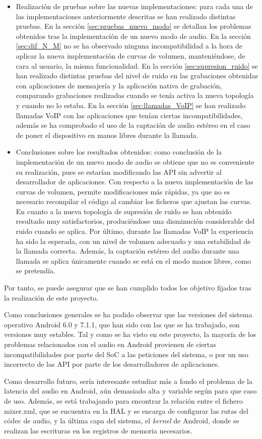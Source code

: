 \begin{itemize}
	\item{Realización de pruebas sobre las nuevas implementaciones: para cada una de las implementaciones anteriormente descritas se han realizado distintas pruebas. En la sección \ref{sec:pruebas_nuevo_modo} se detallan los problemas obtenidos tras la implementación de un nuevo modo de audio. En la sección \ref{sec:dif_N_M} no se ha observado ninguna incompatibilidad a la hora de aplicar la nueva implementación de curvas de volumen, manteniéndose, de cara al usuario, la misma funcionalidad. En la sección \ref{sec:supresion_ruido} se han realizado distintas pruebas del nivel de ruido en las grabaciones obtenidas con aplicaciones de mensajería y la aplicación nativa de grabación, comparando grabaciones realizadas cuando se tenía activa la nueva topología y cuando no lo estaba. En la sección \ref{sec:llamadas_VoIP} se han realizado llamadas \gls{VoIP} con las aplicaciones que tenían ciertas incompatibilidades, además se ha comprobado el uso de la captación de audio estéreo en el caso de poner el dispositivo en manos libres durante la llamada.}
	\item{Conclusiones sobre los resultados obtenidos: como conclusión de la implementación de un nuevo modo de audio se obtiene que no es conveniente su realización, pues se estarían modificando las \gls{API} sin advertir al desarrollador de aplicaciones. Con respecto a la nueva implementación de las curvas de volumen, permite modificaciones más rápidas, ya que no es necesario recompilar el código al cambiar los ficheros que ajustan las curvas. En cuanto a la nueva topología de supresión de ruido se han obtenido resultado muy satisfactorios, produciéndose una disminución considerable del ruido cuando se aplica. Por último, durante las llamadas \gls{VoIP} la experiencia ha sido la esperada, con un nivel de volumen adecuado y una estabilidad de la llamada correcta. Además, la captación estéreo del audio durante una llamada se aplica únicamente cuando se está en el modo manos libres, como se pretendía.}
\end{itemize}

Por tanto, se puede asegurar que se han cumplido todos los objetivo fijados tras la realización de este proyecto.

Como conclusiones generales se ha podido observar que las versiones del sistema operativo Android 6.0 y 7.1.1, que han sido con las que se ha trabajado, son versiones muy estables. Tal y como se ha visto en este proyecto, la mayoría de los problemas relacionados con el audio en Android provienen de  ciertas incompatibilidades por parte del \gls{SoC} a las peticiones del sistema, o por un uso incorrecto de las \gls{API} por parte de los desarrolladores de aplicaciones.

Como desarrollo futuro, sería interesante estudiar más a fondo el problema de la latencia del audio en Android, aún demasiado alta y variable según para que caso de uso. Además, se está trabajando para encontrar la relación entre el fichero mixer.xml, que se encuentra en la \gls{HAL} y se encarga de configurar las rutas del códec de audio, y la última capa del sistema, el \textit{kernel} de Android, donde se realizan las escrituras en los registros de memoria necesarios.



